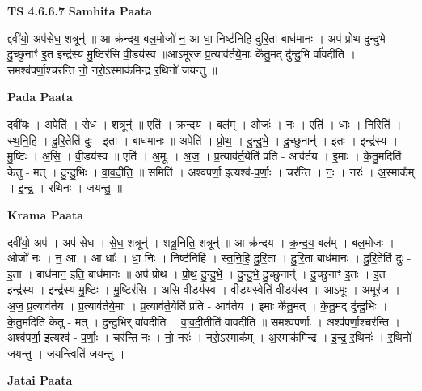 \documentclass[17pt]{extarticle}
\begin{document}
\textbf{TS 4.6.6.7 } \newline
\textbf{Samhita Paata} \newline

द्दवी॑यो॒ अप॑सेध॒ शत्रून्॑ ॥ आ क्र॑न्दय॒ बल॒मोजो॑ न॒ आ धा॒ निष्ट॑निहि दुरि॒ता बाध॑मानः । अप॑ प्रोथ दुन्दुभे दु॒च्छुनाꣳ॑ इ॒त इन्द्र॑स्य मु॒ष्टिर॑सि वी॒डय॑स्व ॥आऽमूर॑ज प्र॒त्याव॑र्तये॒माः के॑तु॒मद् दु॑न्दु॒भि र्वा॑वदीति । समश्व॑पर्णा॒श्चर॑न्ति नो॒ नरो॒ऽस्माक॑मिन्द्र र॒थिनो॑ जयन्तु ॥ \newline

\textbf{Pada Paata} \newline

दवी॑यः । अपेति॑ । से॒ध॒ । शत्रून्॑ ॥ एति॑ । क्र॒न्द॒य॒ । बल᳚म् । ओजः॑ । नः॒ । एति॑ । धाः॒ । निरिति॑ । स्थ॒नि॒हि॒ । दु॒रि॒तेति॑ दुः - इ॒ता । बाध॑मानः ॥ अपेति॑ । प्रो॒थ॒ । दु॒न्दु॒भे॒ । दु॒च्छुनान्॑ । इ॒तः । इन्द्र॑स्य । मु॒ष्टिः । अ॒सि॒ । वी॒डय॑स्व ॥ एति॑ । अ॒मूः । अ॒ज॒ । प्र॒त्याव॑र्त॒येति॑ प्रति - आव॑र्तय । इ॒माः । के॒तु॒मदिति॑ केतु - मत् । दु॒न्दु॒भिः । वा॒व॒दी॒ति॒ ॥ समिति॑ । अश्व॑पर्णा॒ इत्यश्व॑-प॒र्णाः॒ । चर॑न्ति । नः॒ । नरः॑ । अ॒स्माक᳚म् । इ॒न्द्र॒ । र॒थिनः॑ । ज॒य॒न्तु॒ ॥  \newline


\textbf{Krama Paata} \newline

दवी॑यो॒ अप॑ । अप॑ सेध । से॒ध॒ शत्रून्॑ । शत्रू॒निति॒ शत्रून्॑ ॥ आ क्र॑न्दय । क्र॒न्द॒य॒ बल᳚म् । बल॒मोजः॑ । ओजो॑ नः । न॒ आ । आ धाः᳚ । धा॒ निः । निष्ट॑निहि । स्त॒नि॒हि॒ दु॒रि॒ता । दु॒रि॒ता बाध॑मानः । दु॒रि॒तेति॑ दुः - इ॒ता । बाध॑मान॒ इति॒ बाध॑मानः ॥ अप॑ प्रोथ । प्रो॒थ॒ दु॒न्दु॒भे॒ । दु॒न्दु॒भे॒ दु॒च्छुनान्॑ । दु॒च्छुनाꣳ॑ इ॒तः । इ॒त इन्द्र॑स्य । इन्द्र॑स्य मु॒ष्टिः । मु॒ष्टिर॑सि । अ॒सि॒ वी॒डय॑स्व । वी॒डय॒स्वेति॑ वी॒डय॑स्व ॥ आऽमूः । अ॒मूर॑ज । अ॒ज॒ प्र॒त्याव॑र्तय । प्र॒त्याव॑र्तये॒माः । प्र॒त्याव॑र्त॒येति॑ प्रति - आव॑र्तय । इ॒माः के॑तु॒मत् । के॒तु॒मद् दु॑न्दु॒भिः । के॒तु॒मदिति॑ केतु - मत् । दु॒न्दु॒भिर् वा॑वदीति । वा॒व॒दी॒तीति॑ वावदीति ॥ समश्व॑पर्णाः । अश्व॑पर्णा॒श्चर॑न्ति । अश्व॑पर्णा॒ इत्यश्व॑ - प॒र्णाः॒ । चर॑न्ति नः । नो॒ नरः॑ । नरो॒ऽस्माक᳚म् । अ॒स्माक॑मिन्द्र । इ॒न्द्र॒ र॒थिनः॑ । र॒थिनो॑ जयन्तु । 
ज॒य॒न्त्विति॑ जयन्तु । \newline

\textbf{Jatai Paata} \newline
\end{document}

